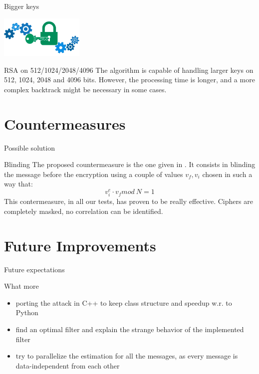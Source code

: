 \documentclass[aspectratio=169, handout]{beamer}
\begin{document}
\begin{frame}{Bigger keys}
  \begin{center}
    \includegraphics[width=4cm]{./graphics/key}
  \end{center}
  \begin{block}{RSA on 512/1024/2048/4096}
		The algorithm is capable of handling larger keys on 512, 1024, 2048 and 4096 bits.
    However, the processing time is longer, and a more complex backtrack might be necessary in some cases.
	\end{block}
\end{frame}



\section{Countermeasures}
\begin{frame}{Possible solution}
    \begin{block}{Blinding}
		The proposed countermeasure is the one given in \cite{kocher1996timing}.
		It consists in blinding the message before the encryption using a couple of values $v_f, v_i$ chosen in such a way that:
		\begin{equation*}
			v_i^e \cdot v_f mod\: N = 1
		\end{equation*}
        This contermeasure, in all our tests, has proven to be really effective. Ciphers are completely masked, no correlation can be identified.
    \end{block}
\end{frame}

\section{Future Improvements}
\begin{frame}{Future expectations}
  \begin{block}{What more}
    \begin{itemize}
      \pause \item porting the attack in C++ to keep class structure and speedup w.r. to Python
      \pause \item find an optimal filter and explain the strange behavior of the implemented filter
      \pause \item try to parallelize the estimation for all the messages, as every message is data-independent from each other
    \end{itemize}
  \end{block}
\end{frame}
\end{document}
